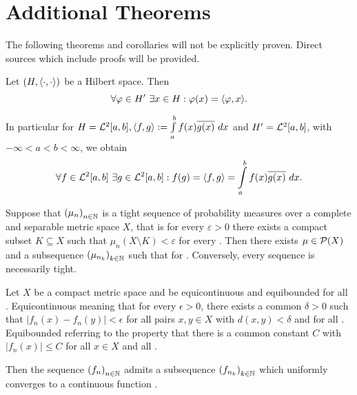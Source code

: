 \chapter*{Additional Theorems}\label{appendix}

\setcounter{theorem}{0}
\renewcommand\thetheorem{A.\arabic{theorem}}

The following theorems and corollaries will not be explicitly proven. Direct sources which include proofs will be provided.

\begin{theorem}\label{Rie-Fre}
	Let $(H, \inner{\cdot}{\cdot})$ be a Hilbert space. Then
	\[ \forall \varphi \in H'~\exists x \in H: \varphi(x) = \inner{\varphi}{x}. \]
\end{theorem}

\begin{corollary}
	In particular for $H = \ELL{2}[a, b], \inner{f}{g} := \int\limits_a^b f(x) \conj{g(x)}~dx$ and $H' = \ELL{2}[a,b]$, with $-\infty < a < b < \infty$, we obtain
	\[ \forall f \in \ELL{2}[a,b]~\exists g \in \ELL{2}[a,b]: f(g) = \inner{f}{g} = \int\limits_a^b f(x) \conj{g(x)}~dx. \]
\end{corollary}


\begin{theorem}\label{Prok}
	Suppose that ${(\mu_n)}_{\NinN}$ is a tight sequence of probability measures over a complete and separable metric space $X$, that is for every $\varepsilon > 0$ there exists a compact subset $K \subseteq X$ such that $\mu_n(X \setminus K) < \varepsilon$ for every \NinN. Then there exists $\mu \in \PM{X}$ and a subsequence ${(\mu_{n_k})}_{\NinN[k]}$ such that  for \Ninf[k]. Conversely, every sequence  is necessarily tight.
\end{theorem}

\begin{theorem}\label{Arz-Asc}
	Let $X$ be a compact metric space and  be equicontinuous and equibounded for all \NinN. Equicontinuous meaning that for every $\epsilon > 0$, there exists a common $\delta > 0$ such that $|f_n(x) - f_n(y)| < \epsilon$ for all pairs $x, y \in X$ with $d(x, y) < \delta$ and for all \NinN. Equibounded referring to the property that there is a common constant $C$ with $|f_n(x)| \le C$ for all $x \in X$ and all \NinN.

	Then the sequence ${(f_n)}_{\NinN}$ admits a subsequence ${(f_{n_k})}_{\NinN[k]}$ which uniformly converges to a continuous function .
\end{theorem}

